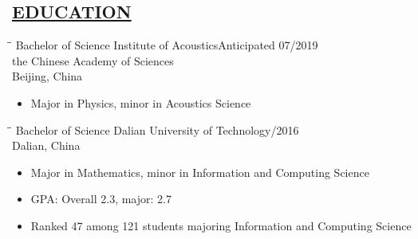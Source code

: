\documentclass{res} %
\begin{document}

\address{Email: karel.wang@gmail.com, \ Phone: +86 18130056757 
\\
\\
Current Address: University of Chinese Academy of Sciences,\\ \qquad \qquad 
\qquad {} Huaibeizhuang, Huairou District,\\ \qquad \qquad 
\qquad \qquad Beijing, China}

\begin{resume}
\section{\underline{EDUCATION}}


\vspace{-0.02in}	
\begin{tabbing}
    \hspace{2.2in}\= \hspace{2.8in}\= \kill %
    Bachelor of Science   \>Institute of Acoustics\>Anticipated 07/2019  \\
                        \> the Chinese Academy of Sciences \>\\
                        \> Beijing, China\>\\
    \end{tabbing}\vspace{-22pt}      %
\vspace{+0.05in}
\begin{itemize}
  \item Major in Physics, minor in Acoustics Science

\end{itemize}
\vspace{-0.1in}

\vspace{-0.02in}	
\begin{tabbing}
    \hspace{2.2in}\= \hspace{2.8in}\= \kill %
    Bachelor of Science   \>Dalian University of Technology/2016  \\
                        \> Dalian, China \>\\
    \end{tabbing}\vspace{-22pt}      %
\vspace{+0.05in}
\begin{itemize}
  \item Major in Mathematics, minor in Information and Computing Science
  \item GPA: Overall 2.3, major: 2.7
  \item Ranked 47 among 121 students majoring Information and Computing Science
\end{itemize}
\vspace{-0.1in}


\end{resume}
\end{document}
